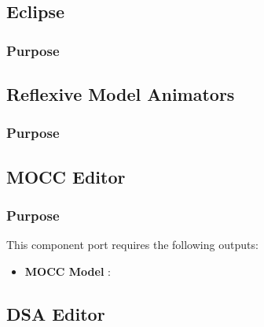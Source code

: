 \documentclass{gemoc} %
\begin{document}


\subsection{Eclipse}


\subsubsection{Purpose}



\subsection{Reflexive Model Animators}


\subsubsection{Purpose}



\subsection{MOCC Editor}


\subsubsection{Purpose}


This component port requires the following outputs:
\begin{itemize}
  \item \textbf{MOCC Model} :
\end{itemize}

\subsection{DSA Editor}
\end{document}
